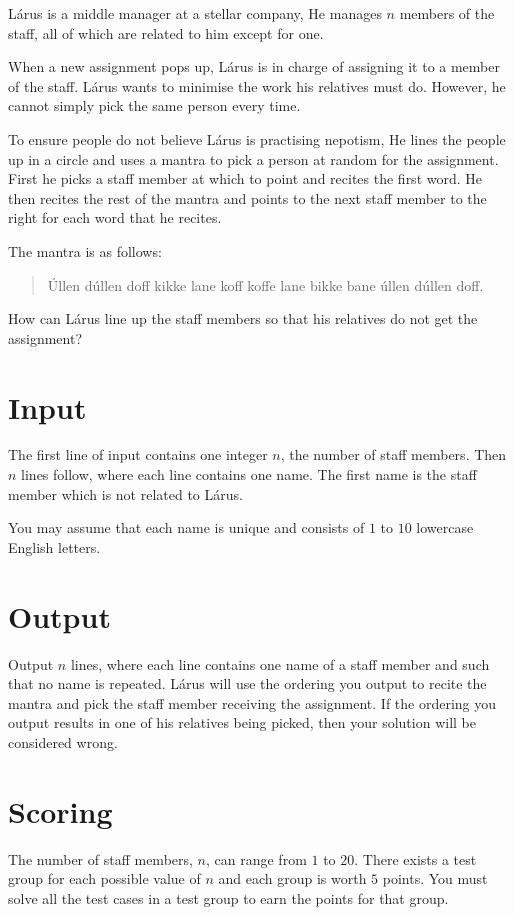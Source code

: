 
Lárus is a middle manager at a stellar company,
He manages $n$ members of the staff, all of which are related to him except for one.

When a new assignment pops up, Lárus is in charge of assigning it to a member of the staff.
Lárus wants to minimise the work his relatives must do.
However, he cannot simply pick the same person every time.

To ensure people do not believe Lárus is practising nepotism, 
He lines the people up in a circle and uses a mantra to pick a person at random for the assignment.
First he picks a staff member at which to point and recites the first word.
He then recites the rest of the mantra and points to the next staff member to the right for each word that he recites.

The mantra is as follows:

\begin{quote}
    Úllen dúllen doff kikke lane koff koffe lane bikke bane úllen dúllen doff.
\end{quote}

How can Lárus line up the staff members so that his relatives do not get the assignment?

\section*{Input}
The first line of input contains one integer $n$, the number of staff members.
Then $n$ lines follow, where each line contains one name.
The first name is the staff member which is not related to Lárus.

You may assume that each name is unique and consists of $1$ to $10$ lowercase English letters.

\section*{Output}
Output $n$ lines, where each line contains one name of a staff member and such that no name is repeated.
Lárus will use the ordering you output to recite the mantra and pick the staff member receiving the assignment.
If the ordering you output results in one of his relatives being picked, then your solution will be considered wrong.

\section*{Scoring}
The number of staff members, $n$, can range from $1$ to $20$.
There exists a test group for each possible value of $n$ and each group is worth $5$ points.
You must solve all the test cases in a test group to earn the points for that group.

